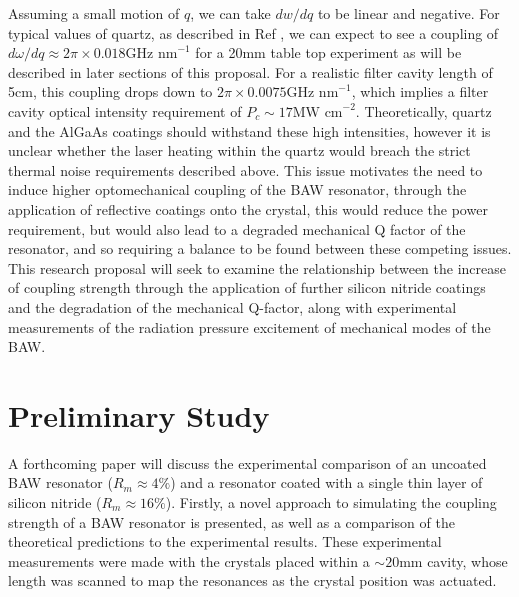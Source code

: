 \documentclass[aps,  
                a4paper, 
                amsmath, 
                amssymb, 
                preprint,
                tightenlines,  
                amsfonts,
                nofootinbib,
                onecolumn,
                titlepage,
                10pt
            ]{revtex4-2}
\begin{document}
    Assuming a small motion of $q$, we can take $dw/dq$ to be linear and negative. For typical values of quartz, as described in Ref \cite{page2021}, we can expect to see a coupling of $d\omega/dq\approx2\pi\times0.018\text{GHz nm}^{-1}$ for a 20mm table top experiment as will be described in later sections of this proposal. For a realistic filter cavity length of 5cm, this coupling drops down to $2\pi\times0.0075\text{GHz nm}^{-1}$, which implies a filter cavity optical intensity requirement of $P_c\sim17\text{MW cm}^{-2}$. Theoretically, quartz and the AlGaAs coatings should withstand these high intensities, however it is unclear whether the laser heating within the quartz would breach the strict thermal noise requirements described above. This issue motivates the need to induce higher optomechanical coupling of the BAW resonator, through the application of reflective coatings onto the crystal, this would reduce the power requirement, but would also lead to a degraded mechanical Q factor of the resonator, and so requiring a balance to be found between these competing issues. This research proposal will seek to examine the relationship between the increase of coupling strength through the application of further silicon nitride coatings and the degradation of the mechanical Q-factor, along with experimental measurements of the radiation pressure excitement of mechanical modes of the BAW.

    \section{Preliminary Study}
    A forthcoming paper will discuss the experimental comparison of an uncoated BAW resonator ($R_m\approx4\%$) and a resonator coated with a single thin layer of silicon nitride ($R_m\approx16\%$). Firstly, a novel approach to simulating the coupling strength of a BAW resonator is presented, as well as a comparison of the theoretical predictions to the experimental results. These experimental measurements were made with the crystals placed within a $\sim20$mm cavity, whose length was scanned to map the resonances as the crystal position was actuated. 
\end{document}
